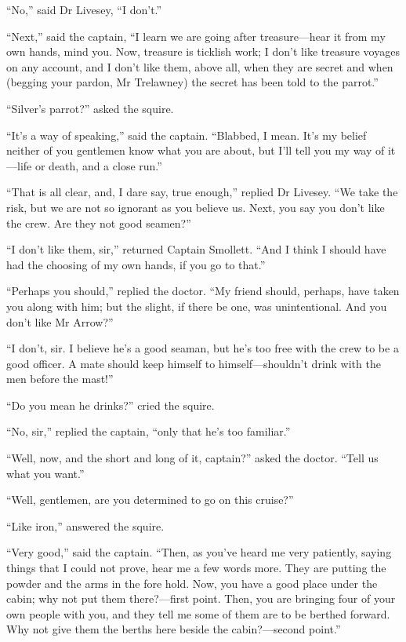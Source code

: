 \enquote{No,} said Dr Livesey, \enquote{I don’t.}

\enquote{Next,} said the captain, \enquote{I learn we are going after treasure---hear it from my own hands, mind you. Now, treasure is ticklish work; I don’t like treasure voyages on any account, and I don’t like them, above all, when they are secret and when (begging your pardon, Mr Trelawney) the secret has been told to the parrot.}

\enquote{Silver’s parrot?} asked the squire.

\enquote{It’s a way of speaking,} said the captain. \enquote{Blabbed, I mean. It’s my belief neither of you gentlemen know what you are about, but I’ll tell you my way of it---life or death, and a close run.}

\enquote{That is all clear, and, I dare say, true enough,} replied Dr Livesey. \enquote{We take the risk, but we are not so ignorant as you believe us. Next, you say you don’t like the crew. Are they not good seamen?}

\enquote{I don’t like them, sir,} returned Captain Smollett. \enquote{And I think I should have had the choosing of my own hands, if you go to that.}

\enquote{Perhaps you should,} replied the doctor. \enquote{My friend should, perhaps, have taken you along with him; but the slight, if there be one, was unintentional. And you don’t like Mr Arrow?}

\enquote{I don’t, sir. I believe he’s a good seaman, but he’s too free with the crew to be a good officer. A mate should keep himself to himself---shouldn’t drink with the men before the mast!}

\enquote{Do you mean he drinks?} cried the squire.

\enquote{No, sir,} replied the captain, \enquote{only that he’s too familiar.}

\enquote{Well, now, and the short and long of it, captain?} asked the doctor. \enquote{Tell us what you want.}

\enquote{Well, gentlemen, are you determined to go on this cruise?}

\enquote{Like iron,} answered the squire.

\enquote{Very good,} said the captain. \enquote{Then, as you’ve heard me very patiently, saying things that I could not prove, hear me a few words more. They are putting the powder and the arms in the fore hold. Now, you have a good place under the cabin; why not put them there?---first point. Then, you are bringing four of your own people with you, and they tell me some of them are to be berthed forward. Why not give them the berths here beside the cabin?---second point.}

